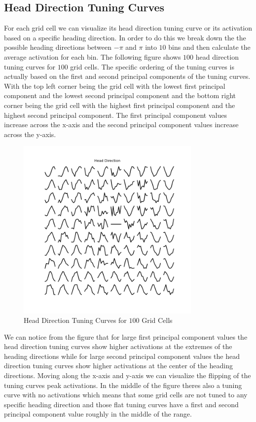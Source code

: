\documentclass[12pt, letterpaper]{article}
\begin{document}
\subsection{Head Direction Tuning Curves}
For each grid cell we can visualize its head direction tuning curve or its activation based on a specific heading direction. In order to do this we break down the the possible heading directions between $-\pi$ and $\pi$ into $10$ bins and then calculate the average activation for each bin. The following figure shows $100$ head direction tuning curves for $100$ grid cells. The specific ordering of the tuning curves is actually based on the first and second principal components of the tuning curves. With the top left corner being the grid cell with the lowest first principal component and the lowest second principal component and the bottom right corner being the grid cell with the highest first principal component and the highest second principal component. The first principal component values increase across the x-axis and the second principal component values increase across the y-axis.

\begin{figure}[H]
    \centering
    \includegraphics[width=0.8\textwidth]{head_direction.png}
    \caption{Head Direction Tuning Curves for $100$ Grid Cells}
    \label{fig:head_direction}
\end{figure}

We can notice from the figure that for large first principal component values the head direction tuning curves show higher activations at the extremes of the heading directions while for large second principal component values the head direction tuning curves show higher activations at the center of the heading directions. Moving along the x-axis and y-axis we can visualize the flipping of the tuning curves peak activations. In the middle of the figure theres also a tuning curve with no activations which means that some grid cells are not tuned to any specific heading direction and those flat tuning curves have a first and second principal component value roughly in the middle of the range.
\end{document}
